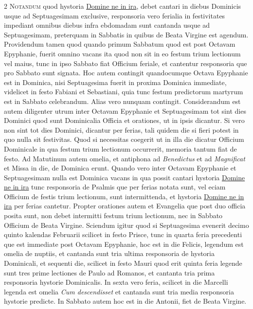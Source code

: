 \begin{multicols*}{2}
\lettrine[lines=2]{\zallmancaps \color{Red} N}{otandum} quod hystoria \hyperlink{domine-ne-in-ira}{Domine ne in ira}, debet cantari in diebus Dominicis usque ad Septuagesimam exclusive, responsoria vero ferialia in festivitates impediant omnibus diebus infra ebdomadam sunt cantanda usque ad Septuagesimam, preterquam in Sabbatis in quibus de Beata Virgine est agendum.
Providendum tamen quod quando primum Sabbatum quod est post Octavam Epyphanie, fuerit omnino vacans ita quod non sit in eo festum trium lectionum vel maius, tunc in ipso Sabbato fiat Officium feriale, et cantentur responsoria que pro Sabbato sunt signata.
Hoc autem contingit quandocumque Octava Epyphanie est in Dominica, nisi Septuagesima fuerit in proxima Dominica immediate, videlicet in festo Fabiani et Sebastiani, quia tunc festum predictorum martyrum est in Sabbato celebrandum. Alias vero nunquam contingit.
Considerandum est autem diligenter utrum inter Octavam Epyphanie et Septuagesimam tot sint dies Dominici quod sunt Dominicalia Officia et orationes, ut in ipsis dicantur. Si vero non sint tot dies Dominici, dicantur per ferias, tali quidem die si fieri potest in quo nulla sit festivitas. Quod si necessitas coegerit ut in illa die dicatur Officium Dominicale in qua festum trium lectionum occurrerit, memoria tantum fiat de festo.
Ad Matutinum autem omelia, et antiphona ad \textit{Benedictus} et ad \textit{Magnificat} et Missa in die, de Dominica erunt.
Quando vero inter Octavam Epyphanie et Septuagesimam nulla est Dominica vacans in qua possit cantari hystoria \hyperlink{domine-ne-in-ira}{Domine ne in ira} tunc responsoria de Psalmis que per ferias notata sunt, vel eciam Officium de festis trium lectionum, sunt intermittenda, et hystoria \hyperlink{domine-ne-in-ira}{Domine ne in ira} per ferias cantetur.
Propter orationes autem et Evangelia que post duo officia posita sunt, non debet intermitti festum trium lectionum, nec in Sabbato Officium de Beata Virgine.
Sciendum igitur quod si Septuagesima evenerit decimo quinto kalendas Februarii scilicet in festo Prisce, tunc in quarta feria precedenti que est immediate post Octavam Epyphanie, hoc est in die Felicis, legendum est omelia de nuptiis, et cantanda sunt tria ultima responsoria de hystoria Dominicali, et sequenti die, scilicet in festo Mauri quod erit quinta feria legende sunt tres prime lectiones de Paulo ad Romanos, et cantanta tria prima responsoria hystorie Dominicalis. In sexta vero feria, scilicet in die Marcelli legenda est omelia \textit{Cum descendisset} et cantanda sunt tria media responsoria hystorie predicte. In Sabbato autem hoc est in die Antonii, fiet de Beata Virgine.

\end{multicols*}
